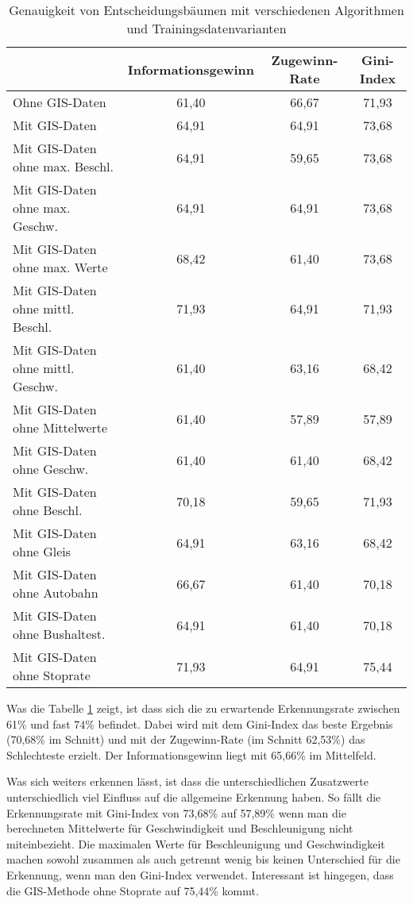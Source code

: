 \begin{table}[h]
\centering
\begin{tabular}{|l|c|c|c|}
\hline
 & {\bf Informationsgewinn} & {\bf Zugewinn-Rate} & {\bf Gini-Index} \\ \hline
Ohne GIS-Daten & 61,40 & 66,67 & 71,93 \\ \hline
Mit GIS-Daten & 64,91 & 64,91 & 73,68 \\ \hline
Mit GIS-Daten ohne max. Beschl. & 64,91 & 59,65 & 73,68 \\ \hline
Mit GIS-Daten ohne max. Geschw. & 64,91 & 64,91 & 73,68 \\ \hline
Mit GIS-Daten ohne max. Werte & 68,42 & 61,40 & 73,68 \\ \hline
Mit GIS-Daten ohne mittl. Beschl. & 71,93 & 64,91 & 71,93 \\ \hline
Mit GIS-Daten ohne mittl. Geschw. & 61,40 & 63,16 & 68,42 \\ \hline
Mit GIS-Daten ohne Mittelwerte & 61,40 & 57,89 & 57,89 \\ \hline
Mit GIS-Daten ohne Geschw. & 61,40 & 61,40 & 68,42 \\ \hline
Mit GIS-Daten ohne Beschl. & 70,18 & 59,65 & 71,93 \\ \hline
Mit GIS-Daten ohne Gleis & 64,91 & 63,16 & 68,42 \\ \hline
Mit GIS-Daten ohne Autobahn & 66,67 & 61,40 & 70,18 \\ \hline
Mit GIS-Daten ohne Bushaltest. & 64,91 & 61,40 & 70,18 \\ \hline
Mit GIS-Daten ohne Stoprate & 71,93 & 64,91 & 75,44 \\ \hline
\end{tabular}
\caption{Genauigkeit von Entscheidungsbäumen mit verschiedenen Algorithmen und Trainingsdatenvarianten}
\label{dt-calculation-methods}
\end{table}

Was die Tabelle \ref{dt-calculation-methods} zeigt, ist dass sich die zu erwartende Erkennungsrate zwischen 61\% und fast 74\% befindet. Dabei wird mit dem Gini-Index das beste Ergebnis (70,68\% im Schnitt) und mit der Zugewinn-Rate (im Schnitt 62,53\%) das Schlechteste erzielt. Der Informationsgewinn liegt mit 65,66\% im Mittelfeld.

Was sich weiters erkennen lässt, ist dass die unterschiedlichen Zusatzwerte unterschiedlich viel Einfluss auf die allgemeine Erkennung haben. So fällt die Erkennungsrate mit Gini-Index von 73,68\% auf 57,89\% wenn man die berechneten Mittelwerte für Geschwindigkeit und Beschleunigung nicht miteinbezieht. Die maximalen Werte für Beschleunigung und Geschwindigkeit machen sowohl zusammen als auch getrennt wenig bis keinen Unterschied für die Erkennung,  wenn man den Gini-Index verwendet. Interessant ist hingegen, dass die GIS-Methode ohne Stoprate auf 75,44\% kommt.


